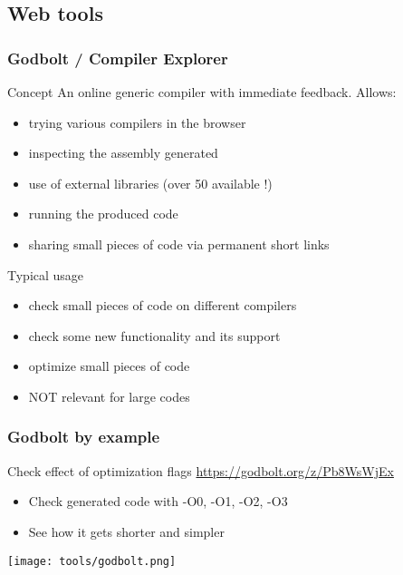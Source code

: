 \subsection[web]{Web tools}

\begin{frame}
  \frametitle{Godbolt / Compiler Explorer }
  \begin{block}{Concept}
    An online generic compiler with immediate feedback.
    Allows:
    \begin{itemize}
    \item trying various compilers in the browser
    \item inspecting the assembly generated
    \item use of external libraries (over 50 available !)
    \item running the produced code
    \item sharing small pieces of code via permanent short links
    \end{itemize}
  \end{block}
  \begin{exampleblock}{Typical usage}
    \begin{itemize}
    \item check small pieces of code on different compilers
    \item check some new \cpp functionality and its support
    \item optimize small pieces of code
    \item NOT relevant for large codes
    \end{itemize}
  \end{exampleblock}
\end{frame}

\begin{frame}
  \frametitle{Godbolt by example}
  \begin{block}{Check effect of optimization flags}
    \url{https://godbolt.org/z/Pb8WsWjEx}
    \begin{itemize}
    \item Check generated code with -O0, -O1, -O2, -O3
    \item See how it gets shorter and simpler
    \end{itemize}
  \end{block}
  \texttt{[image: tools/godbolt.png]}
\end{frame}

